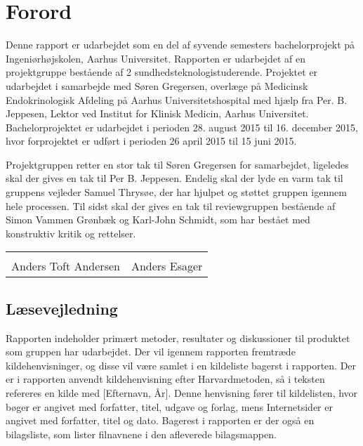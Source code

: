 \chapter*{Forord}

Denne rapport er udarbejdet som en del af syvende semesters bachelorprojekt på Ingeniørhøjskolen, Aarhus Universitet. Rapporten er udarbejdet af en projektgruppe bestående af 2 sundhedsteknologistuderende. Projektet er udarbejdet i samarbejde med Søren Gregersen, overlæge på Medicinsk Endokrinologisk Afdeling på Aarhus Universitetshospital med hjælp fra Per. B. Jeppesen, Lektor ved Institut for Klinisk Medicin, Aarhus Universitet. Bachelorprojektet er udarbejdet i perioden 28. august 2015 til 16. december 2015, hvor forprojektet er udført i perioden 26 april 2015 til 15 juni 2015.  

Projektgruppen retter en stor tak til Søren Gregersen for samarbejdet, ligeledes skal der gives en tak til Per B. Jeppesen. Endelig skal der lyde en varm tak til gruppens vejleder Samuel Thrysøe, der har hjulpet og støttet gruppen igennem hele processen. Til sidst skal der gives en tak til reviewgruppen bestående af Simon Vammen Grønbæk og Karl-John Schmidt, som har bestået med konstruktiv kritik og rettelser. 






\phantom{Luft}

\phantom{Luft}

\begin{table}[H]
	\centering
		\begin{tabular}{c c}
			\underline{\phantom{mmmmmmmmmmmmmm}} & \underline{\phantom{mmmmmmmmmmmmmm}}  \\
			Anders Toft Andersen			& Anders Esager		 			\\ 										\end{tabular}
\end{table}

\section*{Læsevejledning}
Rapporten indeholder primært metoder, resultater og diskussioner til produktet som gruppen har udarbejdet. Der vil igennem rapporten fremtræde kildehenvisninger, og disse vil være samlet i en kildeliste bagerst i rapporten. Der er i rapporten anvendt kildehenvisning efter Harvardmetoden, så i teksten refereres en kilde med [Efternavn, År]. Denne henvisning fører til kildelisten, hvor bøger er angivet med forfatter, titel, udgave og forlag, mens Internetsider er angivet med forfatter, titel og dato. Bagerest i rapporten er der også en bilagsliste, som lister filnavnene i den afleverede bilagsmappen.

